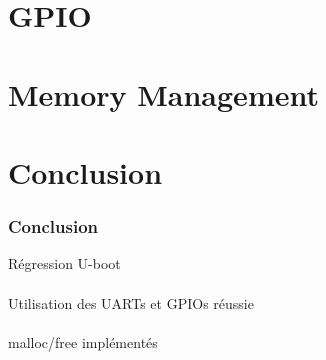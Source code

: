 \documentclass{beamer}
\begin{document}
\section{GPIO}
\subsection{ }

\begin{frame}
\frametitle{ }
\end{frame}

\section{Memory Management}
\subsection{ }
\begin{frame}
  \frametitle{}
\end{frame}

\let\origaddtocontents=\addtocontents
\def\dontaddtocontents#1#2{}
\let\addtocontents=\dontaddtocontents
\section*{Conclusion}
\let\addtocontents=\origaddtocontents

\begin{frame}
  \frametitle{Conclusion}
  Régression U-boot \\~\\
  Utilisation des UARTs et GPIOs réussie \\~\\
  malloc/free implémentés \\~\\
\end{frame}
\end{document}
